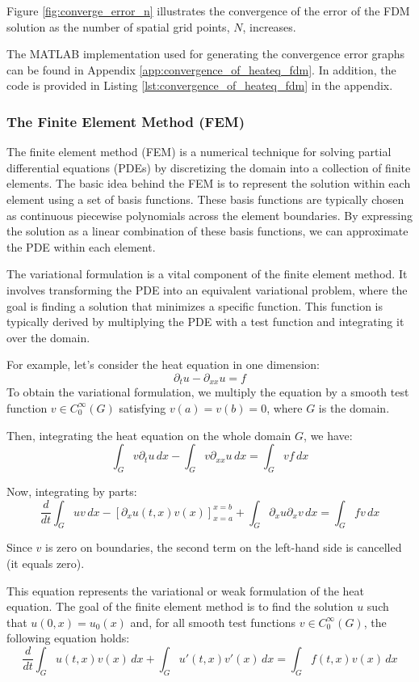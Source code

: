 Figure \ref{fig:converge_error_n} illustrates the convergence of the error of the FDM solution as the number of spatial grid points, $N$, increases.

The MATLAB implementation used for generating the convergence error graphs can be found in Appendix \ref{app:convergence_of_heateq_fdm}. In addition, the code is provided in Listing \ref{lst:convergence_of_heateq_fdm} in the appendix.

\subsubsection{The Finite Element Method (FEM)}

The finite element method (FEM) is a numerical technique for solving partial differential equations (PDEs) by discretizing the domain into a collection of finite elements. The basic idea behind the FEM is to represent the solution within each element using a set of basis functions. These basis functions are typically chosen as continuous piecewise polynomials across the element boundaries. By expressing the solution as a linear combination of these basis functions, we can approximate the PDE within each element.

The variational formulation is a vital component of the finite element method. It involves transforming the PDE into an equivalent variational problem, where the goal is finding a solution that minimizes a specific function. This function is typically derived by multiplying the PDE with a test function and integrating it over the domain.

For example, let's consider the heat equation in one dimension:
\[
\partial_t u - \partial_{xx} u = f
\]
To obtain the variational formulation, we multiply the equation by a smooth test function \(v \in C^{\infty}_0(G)\) satisfying \(v(a) = v(b) = 0\), where \(G\) is the domain. 

Then, integrating the heat equation on the whole domain \(G\), we have:
\[
\int_G v \partial_t u\, dx - \int_G v \partial_{xx} u\, dx = \int_G vf\, dx
\]

Now, integrating by parts:
\[
\frac{{d}}{{dt}}\int_G u v \, dx - \left[\partial_x u (t, x) v(x) \right]_{x=a}^{x=b} + \int_G \partial_{x} u \partial_{x} v\, dx = \int_G f v\, dx
\]

Since $v$ is zero on boundaries, the second term on the left-hand side is cancelled (it equals zero).

This equation represents the variational or weak formulation of the heat equation. The goal of the finite element method is to find the solution \(u\) such that \(u(0, x) = u_0(x)\) and, for all smooth test functions \(v \in C^{\infty}_0(G)\), the following equation holds:
\[
\frac{{d}}{{dt}}\int_G u(t, x)v(x)\, dx + \int_G u'(t, x) v'(x)\, dx = \int_G f(t, x) v(x)\, dx
\]
